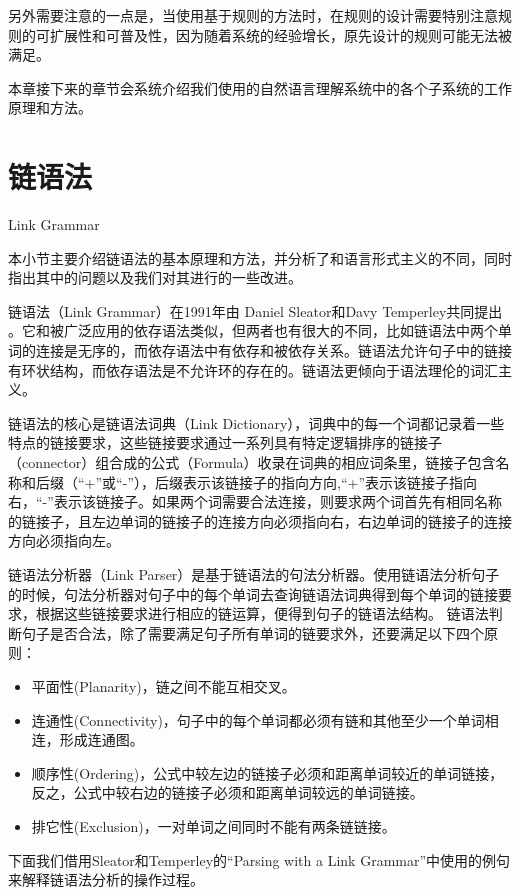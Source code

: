 另外需要注意的一点是，当使用基于规则的方法时，在规则的设计需要特别注意规则的可扩展性和可普及性，因为随着系统的经验增长，原先设计的规则可能无法被满足。

本章接下来的章节会系统介绍我们使用的自然语言理解系统中的各个子系统的工作原理和方法。

\section{链语法}{Link Grammar}\label{sec:linkGrammar}

本小节主要介绍链语法的基本原理和方法，并分析了和语言形式主义的不同，同时指出其中的问题以及我们对其进行的一些改进。

链语法（Link Grammar）在1991年由 Daniel Sleator和Davy Temperley共同提出 \cite{Sleator1993}。它和被广泛应用的依存语法类似，但两者也有很大的不同，比如链语法中两个单词的连接是无序的，而依存语法中有依存和被依存关系。链语法允许句子中的链接有环状结构，而依存语法是不允许环的存在的。链语法更倾向于语法理伦的词汇主义。

链语法的核心是链语法词典（Link Dictionary），词典中的每一个词都记录着一些特点的链接要求，这些链接要求通过一系列具有特定逻辑排序的链接子（connector）组合成的公式（Formula）收录在词典的相应词条里，链接子包含名称和后缀（“+”或“-”），后缀表示该链接子的指向方向,“+”表示该链接子指向右，“-”表示该链接子。如果两个词需要合法连接，则要求两个词首先有相同名称的链接子，且左边单词的链接子的连接方向必须指向右，右边单词的链接子的连接方向必须指向左。

链语法分析器（Link Parser）是基于链语法的句法分析器。使用链语法分析句子的时候，句法分析器对句子中的每个单词去查询链语法词典得到每个单词的链接要求，根据这些链接要求进行相应的链运算，便得到句子的链语法结构。 链语法判断句子是否合法，除了需要满足句子所有单词的链要求外，还要满足以下四个原则：

\begin{itemize}
\item 平面性(Planarity)，链之间不能互相交叉。
\item 连通性(Connectivity)，句子中的每个单词都必须有链和其他至少一个单词相连，形成连通图。
\item 顺序性(Ordering)，公式中较左边的链接子必须和距离单词较近的单词链接，反之，公式中较右边的链接子必须和距离单词较远的单词链接。
\item 排它性(Exclusion)，一对单词之间同时不能有两条链链接。
\end{itemize}

下面我们借用Sleator和Temperley的“Parsing with a Link Grammar”\cite{Sleator1993}中使用的例句来解释链语法分析的操作过程。

